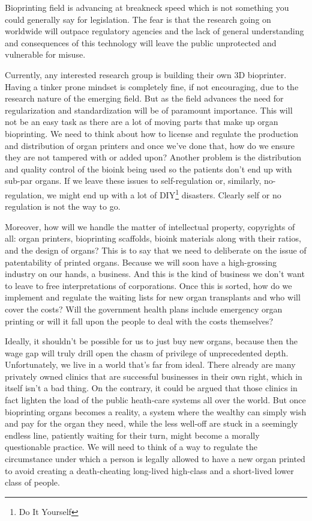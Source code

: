\documentclass[12pt]{article} %
\begin{document}
Bioprinting field is advancing at breakneck speed which is not something you could generally say for legislation. The fear is that the research going on worldwide will outpace regulatory agencies and the lack of general understanding and consequences of this technology will leave the public unprotected and vulnerable for misuse. 

Currently, any interested research group is building their own 3D bioprinter. Having a tinker prone mindset is completely fine, if not encouraging, due to the research nature of the emerging field. But as the field advances the need for regularization and standardization will be of paramount importance. This will not be an easy task as there are a lot of moving parts that make up organ bioprinting. We need to think about how to license and regulate the production and distribution of organ printers and once we've done that, how do we ensure they are not tampered with or added upon? 
Another problem is the distribution and quality control of the bioink being used so the patients don't end up with sub-par organs. If we leave these issues to self-regulation or, similarly, no-regulation, we might end up with a lot of DIY\footnote{Do It Yourself} disasters. Clearly self or no regulation is not the way to go.

Moreover, how will we handle the matter of intellectual property, copyrights of all: organ printers, bioprinting scaffolds, bioink materials along with their ratios, and the design of organs?  This is to say that we need to deliberate on the issue\footnotemark{} of patentability of printed organs. 
Because we will soon have a high-grossing industry on our hands, a business. And this is the kind of business we don't want to leave to free interpretations of corporations. 
Once this is sorted, how do we implement and regulate the waiting lists for new organ transplants and who will cover the costs? Will the government health plans include emergency organ printing or will it fall upon the people to deal with the costs themselves? 

Ideally, it shouldn't be possible for us to just buy new organs, because then the wage gap will truly drill open the chasm of privilege of unprecedented depth. Unfortunately, we live in a world that's far from ideal. There already are many privately owned clinics that are successful businesses in their own right, which in itself isn't a bad thing. 
On the contrary, it could be argued that those clinics in fact lighten the load of the public heath-care systems all over the world. But once bioprinting organs becomes a reality, a system where the wealthy can simply wish and pay for the organ they need, while the less well-off are stuck in a seemingly endless line, patiently waiting for their turn, might become a morally questionable practice. We will need to think of a way to regulate the circumstance under which a person is legally allowed to have a new organ printed to avoid creating a death-cheating long-lived high-class and a short-lived lower class of people.
\end{document}
